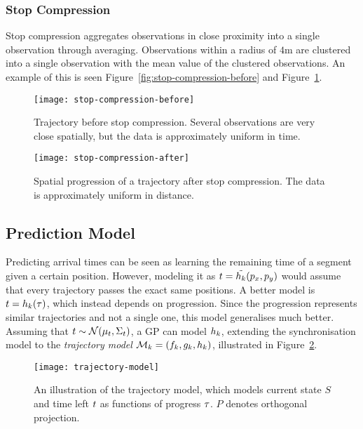 \subsubsection{Stop Compression}
\label{sec:stop-compression}
Stop compression aggregates observations in close proximity into a
single observation through averaging. Observations within a radius of
$4$m are clustered into a single observation with the mean value of
the clustered observations. An example of this is seen
Figure~\ref{fig:stop-compression-before} and Figure~\ref{fig:stop-compression-after}.
\begin{figure}
  \begin{minipage}{.46\textwidth}
    \texttt{[image: stop-compression-before]}
    \caption{Trajectory before stop compression. Several observations
      are very close spatially, but the data is
      approximately uniform in time. }\label{fig:stop-compression-before}
  \end{minipage}
  \hspace{5pt}
  \begin{minipage}{.46\textwidth}
    \texttt{[image: stop-compression-after]}
    \caption{Spatial progression of a trajectory
      after stop compression. The data is
      approximately uniform in distance.}\label{fig:stop-compression-after}
  \end{minipage}
\end{figure}

\subsection{Prediction Model}
Predicting arrival times can be seen as learning the remaining time of
a segment given a certain position. However, modeling it as $t
= \tilde{h_{k}}(p_x, p_y)$ would assume that every trajectory passes the
exact same positions. A better model is $t
= h_{k}(\tau)$, which instead depends on progression. Since the
progression represents similar trajectories and not a single one, this
model generalises much better. Assuming that $t \sim
\mathcal{N}(\mu_{t}, \Sigma_{t})$, a GP can model $h_{k}$, 
extending the synchronisation model to the \textit{trajectory model}
$\mathcal{M}_{k} = (f_{k}, g_{k}, h_{k})$, illustrated in Figure~\ref{fig:trajectory-model}.
\begin{figure}
  \centering
  \texttt{[image: trajectory-model]}
  \caption{An illustration of the trajectory model, which models
    current state $S$ and time left $t$ as functions of
    progress $\tau$. $P$ denotes orthogonal projection.}\label{fig:trajectory-model}
\end{figure}

